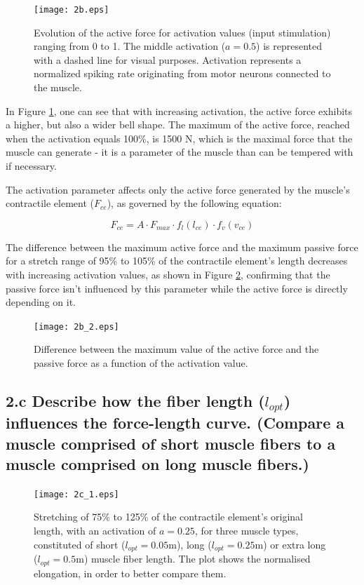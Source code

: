 \documentclass{cmc}
\begin{document}
\begin{figure}[H]
\centering
\texttt{[image: 2b.eps]}
\caption{Evolution of the active force for activation values (input stimulation) ranging from 0 to 1. The middle activation ($a = 0.5$) is represented with a dashed line for visual purposes. Activation represents a normalized spiking rate originating from motor neurons connected to the muscle.}
\label{figure:2b}
\end{figure}

In Figure \ref{figure:2b}, one can see that with increasing activation, the active force exhibits a higher, but also a wider bell shape. The maximum of the active force, reached when the activation equals 100\%, is 1500 N, which is the maximal force that the muscle can generate -  it is a parameter of the muscle than can be tempered with if necessary.

The activation parameter affects only the active force generated by the muscle's contractile element ($F_{ce}$), as governed by the following equation:

\begin{equation}
F_{ce} = A \cdot F_{max} \cdot f_l(l_{ce}) \cdot f_v(v_{ce})
\end{equation}

The difference between the maximum active force and the maximum passive force for a stretch range of 95\% to 105\% of the contractile element's length decreases with increasing activation values, as shown in Figure \ref{figure:2b2}, confirming that the passive force isn't influenced by this parameter while the active force is directly depending on it. 

\begin{figure}[H]
\centering
\texttt{[image: 2b\_2.eps]}
\caption{Difference between the maximum value of the active force and the passive force as a function of the activation value.}
\label{figure:2b2}
\end{figure}

\subsection*{2.c Describe how the fiber length ($l_{opt}$) influences
  the force-length curve.  (Compare a muscle comprised of short muscle
  fibers to a muscle comprised on long muscle fibers.)}

\begin{figure}[H]
\centering
\texttt{[image: 2c\_1.eps]}
\caption{Stretching of 75\% to 125\% of the contractile element's original length, with an activation of $a=0.25$, for three muscle types, constituted of short ($l_{opt}=0.05$m), long ($l_{opt}=0.25$m) or extra long ($l_{opt}=0.5$m) muscle fiber length. The plot shows the normalised elongation, in order to better compare them.}
\label{figure:2c1}
\end{figure}
\end{document}

